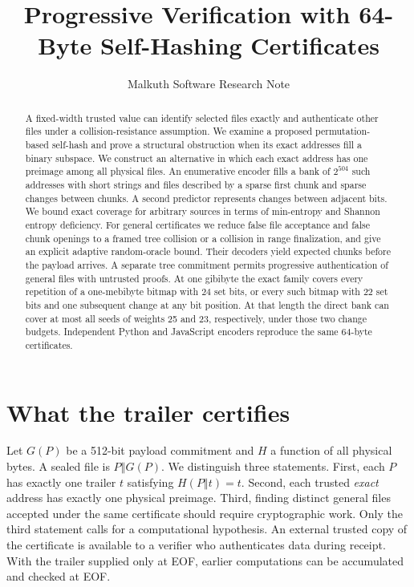 \documentclass[10pt,twocolumn,letterpaper]{article}
\title{\vspace{-2em}\bfseries Progressive Verification with 64-Byte Self-Hashing Certificates}
\author{\normalsize Malkuth Software Research Note}
\date{}
\newcommand{\cat}{\mathbin\Vert}
\begin{document}
\maketitle
\begin{abstract}
A fixed-width trusted value can identify selected files exactly and authenticate other files under a collision-resistance assumption. We examine a proposed permutation-based self-hash and prove a structural obstruction when its exact addresses fill a binary subspace. We construct an alternative in which each exact address has one preimage among all physical files. An enumerative encoder fills a bank of \(2^{504}\) such addresses with short strings and files described by a sparse first chunk and sparse changes between chunks. A second predictor represents changes between adjacent bits. We bound exact coverage for arbitrary sources in terms of min-entropy and Shannon entropy deficiency. For general certificates we reduce false file acceptance and false chunk openings to a framed tree collision or a collision in range finalization, and give an explicit adaptive random-oracle bound. Their decoders yield expected chunks before the payload arrives. A separate tree commitment permits progressive authentication of general files with untrusted proofs. At one gibibyte the exact family covers every repetition of a one-mebibyte bitmap with 24 set bits, or every such bitmap with 22 set bits and one subsequent change at any bit position. At that length the direct bank can cover at most all seeds of weights 25 and 23, respectively, under those two change budgets. Independent Python and JavaScript encoders reproduce the same 64-byte certificates.
\end{abstract}

\section{What the trailer certifies}
Let \(G(P)\) be a 512-bit payload commitment and \(H\) a function of all physical bytes. A sealed file is \(P\cat G(P)\). We distinguish three statements. First, each \(P\) has exactly one trailer \(t\) satisfying \(H(P\cat t)=t\). Second, each trusted \emph{exact} address has exactly one physical preimage. Third, finding distinct general files accepted under the same certificate should require cryptographic work. Only the third statement calls for a computational hypothesis. An external trusted copy of the certificate is available to a verifier who authenticates data during receipt. With the trailer supplied only at EOF, earlier computations can be accumulated and checked at EOF.
\end{document}
